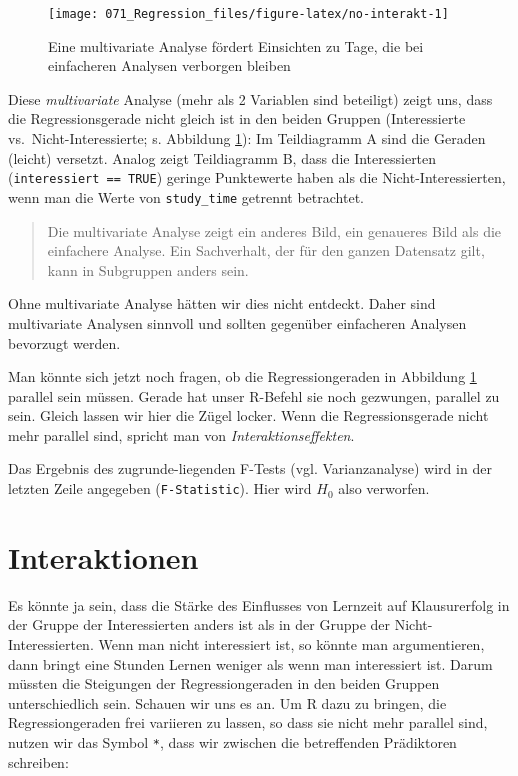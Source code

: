 \documentclass[12pt,ngerman,]{book}
\theoremstyle{definition}
\theoremstyle{definition}
\theoremstyle{remark}
\begin{document}
\begin{figure}

{\centering \texttt{[image: 071\_Regression\_files/figure-latex/no-interakt-1]} 

}

\caption{Eine multivariate Analyse fördert Einsichten zu Tage, die bei einfacheren Analysen verborgen bleiben}\label{fig:no-interakt}
\end{figure}

Diese \emph{multivariate} Analyse (mehr als 2
Variablen sind beteiligt) zeigt uns, dass die Regressionsgerade nicht
gleich ist in den beiden Gruppen (Interessierte vs.~Nicht-Interessierte;
s. Abbildung \ref{fig:no-interakt}): Im Teildiagramm A sind die Geraden
(leicht) versetzt. Analog zeigt Teildiagramm B, dass die Interessierten
(\texttt{interessiert\ ==\ TRUE}) geringe Punktewerte haben als die
Nicht-Interessierten, wenn man die Werte von \texttt{study\_time}
getrennt betrachtet.

\begin{quote}
Die multivariate Analyse zeigt ein anderes Bild, ein genaueres Bild als
die einfachere Analyse. Ein Sachverhalt, der für den ganzen Datensatz
gilt, kann in Subgruppen anders sein.
\end{quote}

Ohne multivariate Analyse hätten wir dies nicht entdeckt. Daher sind
multivariate Analysen sinnvoll und sollten gegenüber einfacheren
Analysen bevorzugt werden.

Man könnte sich jetzt noch fragen, ob die Regressiongeraden in Abbildung
\ref{fig:no-interakt} parallel sein müssen. Gerade hat unser R-Befehl
sie noch gezwungen, parallel zu sein. Gleich lassen wir hier die Zügel
locker. Wenn die Regressionsgerade nicht mehr parallel sind, spricht man
von \emph{Interaktionseffekten}.

Das Ergebnis des zugrunde-liegenden F-Tests (vgl. Varianzanalyse) wird
in der letzten Zeile angegeben (\texttt{F-Statistic}). Hier wird \(H_0\)
also verworfen.

\section{Interaktionen}\label{interaktionen}

Es könnte ja sein, dass die Stärke des Einflusses von Lernzeit auf
Klausurerfolg in der Gruppe der Interessierten anders ist als in der
Gruppe der Nicht-Interessierten. Wenn man nicht interessiert ist, so
könnte man argumentieren, dann bringt eine Stunden Lernen weniger als
wenn man interessiert ist. Darum müssten die Steigungen der
Regressiongeraden in den beiden Gruppen unterschiedlich sein. Schauen
wir uns es an. Um R dazu zu bringen, die Regressiongeraden frei
variieren zu lassen, so dass sie nicht mehr parallel sind, nutzen wir
das Symbol \texttt{*}, dass wir zwischen die betreffenden Prädiktoren
schreiben:
\end{document}
